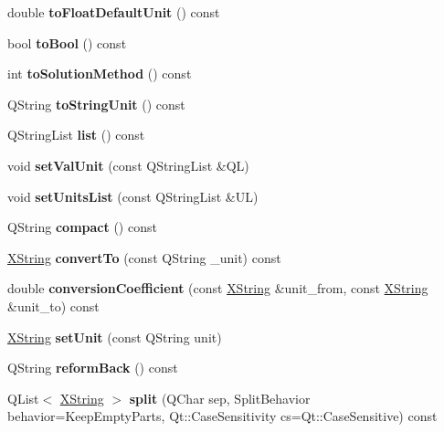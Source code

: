 \begin{DoxyCompactItemize}
\mbox{\label{class_x_string_a76a67ec396c2986828b194d40d14a004}} 
double {\bfseries to\+Float\+Default\+Unit} () const
\item 
\mbox{\label{class_x_string_a808f5b7946f93f11e7564283a26c10f5}} 
bool {\bfseries to\+Bool} () const
\item 
\mbox{\label{class_x_string_a89ef110fb4d7dc524ff15e7e58b93b77}} 
int {\bfseries to\+Solution\+Method} () const
\item 
\mbox{\label{class_x_string_ad6ad63dc2403ae01c93a062c74a87687}} 
Q\+String {\bfseries to\+String\+Unit} () const
\item 
\mbox{\label{class_x_string_aee7fb5dfced7f14f90815f64ee7bb522}} 
Q\+String\+List {\bfseries list} () const
\item 
\mbox{\label{class_x_string_a1f425cd34d0e24b0b6de8e78e8cff557}} 
void {\bfseries set\+Val\+Unit} (const Q\+String\+List \&QL)
\item 
\mbox{\label{class_x_string_a56964ae37cc42be8df8cc81b8c6ef3c7}} 
void {\bfseries set\+Units\+List} (const Q\+String\+List \&UL)
\item 
\mbox{\label{class_x_string_af019c97dd1194ca23840b35d93b7b599}} 
Q\+String {\bfseries compact} () const
\item 
\mbox{\label{class_x_string_aa4415878db17b5db0161edda29acf9ef}} 
\hyperlink{class_x_string}{X\+String} {\bfseries convert\+To} (const Q\+String \+\_\+unit) const
\item 
\mbox{\label{class_x_string_a4b461fb217b3518dbcd45178a19bbf33}} 
double {\bfseries conversion\+Coefficient} (const \hyperlink{class_x_string}{X\+String} \&unit\+\_\+from, const \hyperlink{class_x_string}{X\+String} \&unit\+\_\+to) const
\item 
\mbox{\label{class_x_string_a7cc22be61b29b4ac33a527d530f55260}} 
\hyperlink{class_x_string}{X\+String} {\bfseries set\+Unit} (const Q\+String unit)
\item 
\mbox{\label{class_x_string_ab4d479d20831f5e46f86fc44e6dc57dc}} 
Q\+String {\bfseries reform\+Back} () const
\item 
\mbox{\label{class_x_string_aa47b370b8a7ade03adeb444a59a62c0f}} 
Q\+List$<$ \hyperlink{class_x_string}{X\+String} $>$ {\bfseries split} (Q\+Char sep, Split\+Behavior behavior=Keep\+Empty\+Parts, Qt\+::\+Case\+Sensitivity cs=Qt\+::\+Case\+Sensitive) const
\end{DoxyCompactItemize}
